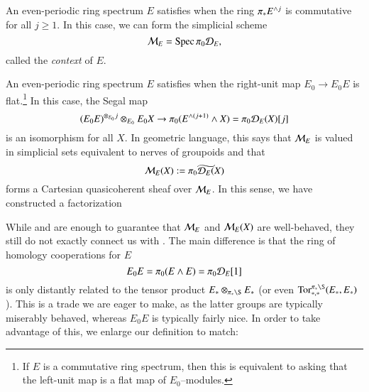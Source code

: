 \begin{definition}
An even-periodic ring spectrum $E$ satisfies  when the ring $\pi_* E^{\wedge j}$ is commutative for all $j \ge 1$.  In this case, we can form the simplicial scheme \[\mathcal{M}_{E} = \operatorname{Spec} \pi_0 \mathcal D_E,\] called the \textit{context} of $E$.
\end{definition}

\begin{definition}
An even-periodic ring spectrum $E$ satisfies  when the right-unit map $E_0 \to E_0 E$ is flat.\footnote{If $E$ is a commutative ring spectrum, then this is equivalent to asking that the left-unit map is a flat map of $E_0$--modules.}  In this case, the Segal map \[(E_0 E)^{\otimes_{E_0} j} \otimes_{E_0} E_0 X \to \pi_0(E^{\wedge (j+1)} \wedge X) = \pi_0 \mathcal D_E(X)[j]\] is an isomorphism for all $X$.  In geometric language, this says that $\mathcal{M}_{E}$ is valued in simplicial sets equivalent to nerves of groupoids and that \[\mathcal{M}_{E}(X) := \widetilde{\pi_0 \mathcal D_E(X)}\] forms a Cartesian quasicoherent sheaf over $\mathcal{M}_{E}$.  In this sense, we have constructed a factorization
\begin{center}
\end{center}
\end{definition}

While {\CH} and {\FH} are enough to guarantee that $\mathcal{M}_{E}$ and $\mathcal{M}_{E}(X)$ are well-behaved, they still do not exactly connect us with .  The main difference is that the ring of homology cooperations for $E$ \[E_0 E = \pi_0(E \wedge E) = \pi_0 \mathcal D_E[1]\] is only distantly related to the tensor product $E_* \otimes_{\pi_* \S} E_*$ (or even $\Tor^{\pi_* \S}_{*, *}(E_*, E_*)$).  This is a trade we are eager to make, as the latter groups are typically miserably behaved, whereas $E_0 E$ is typically fairly nice.  In order to take advantage of this, we enlarge our definition to match:

